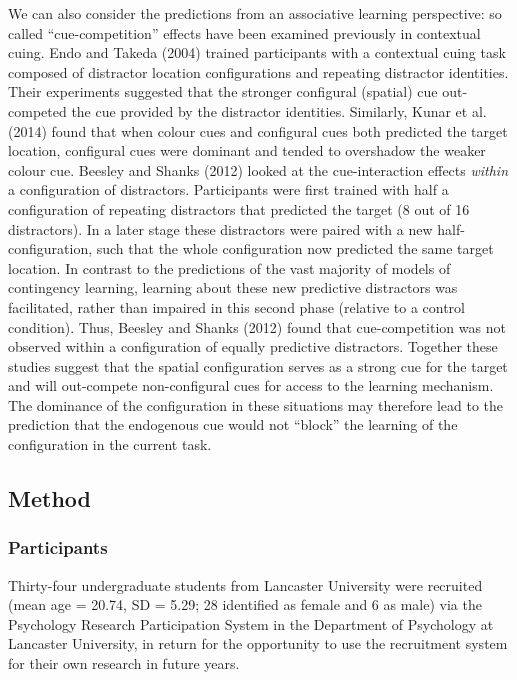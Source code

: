 \documentclass[
  man,
  floatsintext,
  longtable,
  nolmodern,
  notxfonts,
  notimes,
  colorlinks=true,linkcolor=blue,citecolor=blue,urlcolor=blue]{apa7}
\begin{document}
We can also consider the predictions from an associative learning
perspective: so called ``cue-competition'' effects have been examined
previously in contextual cuing. Endo and Takeda (2004) trained
participants with a contextual cuing task composed of distractor
location configurations and repeating distractor identities. Their
experiments suggested that the stronger configural (spatial) cue
out-competed the cue provided by the distractor identities. Similarly,
Kunar et al. (2014) found that when colour cues and configural cues both
predicted the target location, configural cues were dominant and tended
to overshadow the weaker colour cue. Beesley and Shanks (2012) looked at
the cue-interaction effects \emph{within} a configuration of
distractors. Participants were first trained with half a configuration
of repeating distractors that predicted the target (8 out of 16
distractors). In a later stage these distractors were paired with a new
half-configuration, such that the whole configuration now predicted the
same target location. In contrast to the predictions of the vast
majority of models of contingency learning, learning about these new
predictive distractors was facilitated, rather than impaired in this
second phase (relative to a control condition). Thus, Beesley and Shanks
(2012) found that cue-competition was not observed within a
configuration of equally predictive distractors. Together these studies
suggest that the spatial configuration serves as a strong cue for the
target and will out-compete non-configural cues for access to the
learning mechanism. The dominance of the configuration in these
situations may therefore lead to the prediction that the endogenous cue
would not ``block'' the learning of the configuration in the current
task.

\subsection{Method}\label{method-1}

\subsubsection{Participants}\label{participants-1}

Thirty-four undergraduate students from Lancaster University were
recruited (mean age = 20.74, SD = 5.29; 28 identified as female and 6 as
male) via the Psychology Research Participation System in the Department
of Psychology at Lancaster University, in return for the opportunity to
use the recruitment system for their own research in future years.
\end{document}
